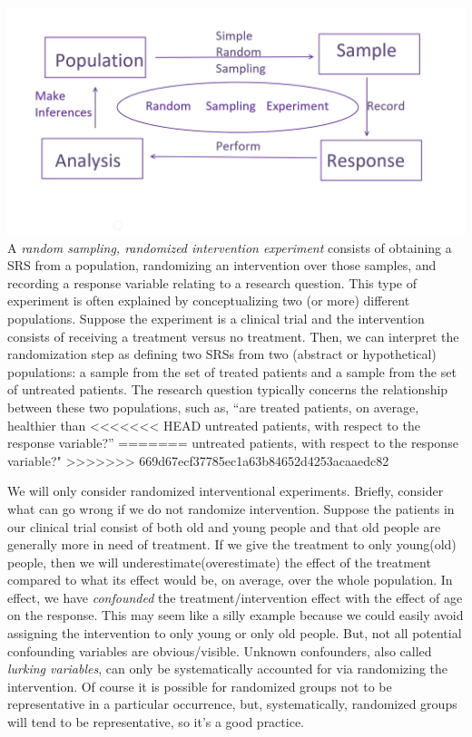 \documentclass[]{book}
\begin{document}
\includegraphics[width=23.85in]{rsediagram} A \emph{random sampling,
randomized intervention experiment} consists of obtaining a SRS from a
population, randomizing an intervention over those samples, and
recording a response variable relating to a research question. This type
of experiment is often explained by conceptualizing two (or more)
different populations. Suppose the experiment is a clinical trial and
the intervention consists of receiving a treatment versus no treatment.
Then, we can interpret the randomization step as defining two SRSs from
two (abstract or hypothetical) populations: a sample from the set of
treated patients and a sample from the set of untreated patients. The
research question typically concerns the relationship between these two
populations, such as, ``are treated patients, on average, healthier than
<<<<<<< HEAD
untreated patients, with respect to the response variable?''
=======
untreated patients, with respect to the response variable?"
>>>>>>> 669d67ecf37785ec1a63b84652d4253acaaedc82

We will only consider randomized interventional experiments. Briefly,
consider what can go wrong if we do not randomize intervention. Suppose
the patients in our clinical trial consist of both old and young people
and that old people are generally more in need of treatment. If we give
the treatment to only young(old) people, then we will
underestimate(overestimate) the effect of the treatment compared to what
its effect would be, on average, over the whole population. In effect,
we have \emph{confounded} the treatment/intervention effect with the
effect of age on the response. This may seem like a silly example
because we could easily avoid assigning the intervention to only young
or only old people. But, not all potential confounding variables are
obvious/visible. Unknown confounders, also called \emph{lurking
variables}, can only be systematically accounted for via randomizing the
intervention. Of course it is possible for randomized groups not to be
representative in a particular occurrence, but, systematically,
randomized groups will tend to be representative, so it's a good
practice.
\end{document}
